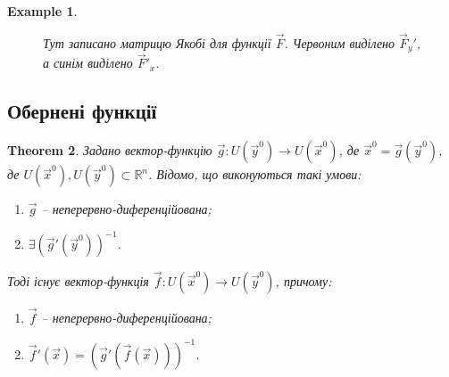 \documentclass[a4paper, 10pt]{article}
\def\departial#1#2{\dfrac{\partial {#1}}{\partial {#2}}}
\theoremstyle{theoremdd}
\newtheorem{theorem}{Theorem}[subsection]
\theoremstyle{theoremdd}
\theoremstyle{theoremdd}
\theoremstyle{theoremdd}
\theoremstyle{theoremdd}
\newtheorem{example}[theorem]{Example}
\theoremstyle{theoremdd}
\theoremstyle{theoremdd}
\theoremstyle{theoremdd}
\theoremstyle{theoremdd}
\begin{document}
\begin{example}
\begin{figure}[H]
\centering
{}
\caption*{Тут записано матрицю Якобі для функції $\vec{F}$. Червоним виділено $\vec{F}_y'$, а синім виділено $\vec{F}'_x$.}
\end{figure}
\end{example}

\subsection{Обернені функції}
\begin{theorem}
Задано вектор-функцію $\vec{g}\colon U(\vec{y}^0) \to U(\vec{x}^0)$, де $\vec{x}^0 = \vec{g}(\vec{y}^0)$, де $U(\vec{x}^0), U(\vec{y}^0) \subset \mathbb{R}^n$. Відомо, що виконуються такі умови:
\begin{enumerate}[nosep,wide=0pt,label={\arabic*)}]
\item $\vec{g}$ -- неперервно-диференційована;
\item $\exists (\vec{g}'(\vec{y}^0))^{-1}$.
\end{enumerate}
Тоді існує вектор-функція $\vec{f}\colon U(\vec{x}^0) \to U(\vec{y}^0)$, причому:
\begin{enumerate}[nosep,wide=0pt,label={\arabic*)}]
\item $\vec{f}$ -- неперервно-диференційована;
\item $\vec{f}'(\vec{x}) = (\vec{g}'(\vec{f}(\vec{x})))^{-1}$.
\end{enumerate}

\end{theorem}
\end{document}
